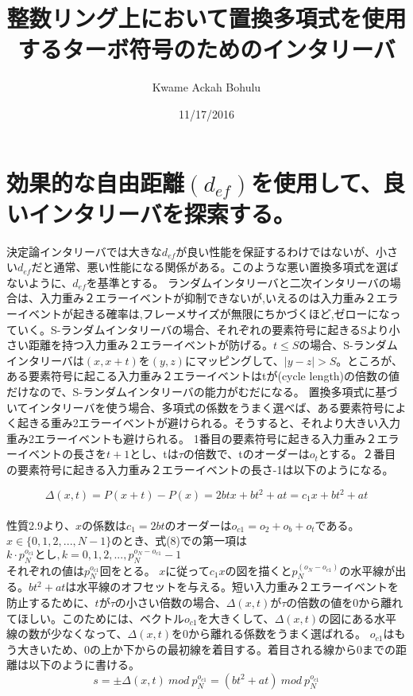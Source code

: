 \documentclass[24 pts]{article}
\title{整数リング上において置換多項式を使用するターボ符号のためのインタリーバ}
\date{11/17/2016}
\author{Kwame Ackah Bohulu}
\begin{document}
\maketitle




\section{効果的な自由距離$(d_{ef})$を使用して、良いインタリーバを探索する。}
決定論インタリーバでは大きな$d_{ef}$が良い性能を保証するわけではないが、小さい$d_{ef}$だと通常、悪い性能になる関係がある。このような悪い置換多項式を選ばないように、$d_{ef}$を基準とする。
ランダムインタリーバと二次インタリーバの場合は、入力重み２エラーイベントが抑制できないが,いえるのは入力重み２エラーイベントが起きる確率は,フレーメサイズが無限にちかづくほど,ゼローになっていく。S-ランダムインタリーバの場合、それぞれの要素符号に起きるSより小さい距離を持つ入力重み２エラーイベントが防げる。$t\leq S$の場合、S-ランダムインタリーバは$(x,x+t)$を$(y,z)$にマッピングして、$|y-z|>S$。ところが、ある要素符号に起こる入力重み２エラーイベントはtが(cycle length)の倍数の値だけなので、S-ランダムインタリーバの能力がむだになる。
置換多項式に基づいてインタリーバを使う場合、多項式の係数をうまく選べば、ある要素符号によく起きる重み2エラーイベントが避けられる。そうすると、それより大きい入力重み2エラーイベントも避けられる。
1番目の要素符号に起きる入力重み２エラーイベントの長さを$t+1$とし、tは$\tau$の倍数で、tのオーダーは$o_t$とする。２番目の要素符号に起きる入力重み２エラーイベントの長さ-1は以下のようになる。

\begin{equation}\tag{8}
\Delta(x,t)=P(x+t)-P(x)=2btx+bt^2+at=c_1x+bt^2+at 
\end{equation}
\paragraph{}
性質2.9より、$x$の係数は$c_1=2bt$のオーダーは$o_{c1}=o_2+o_b+o_t$である。$x\in\{0,1,2,...,N-1\}$のとき、式(8)での第一項は$k\cdot p_N^{o_{c1}}とし,k=0,1,2,...,p_N^{o_N-o_{c1}}-1$\\それぞれの値は$p_N^{o_{c1}}$回をとる。
$x$に従って$c_1x$の図を描くと$p_N^{(o_N-o_{c1})}$の水平線が出る。$bt^2+at$は水平線のオフセットを与える。短い入力重み２エラーイベントを防止するために、$t$が$\tau$の小さい倍数の場合、$\Delta(x,t)$が$\tau$の倍数の値を0から離れてほしい。このためには、ベクトル$o_{c1}$を大きくして、$\Delta(x,t)$の図にある水平線の数が少なくなって、$\Delta(x,t)$を0から離れる係数をうまく選ばれる。
$o_{c1}$はもう大きいため、0の上か下からの最初線を着目する。着目される線から0までの距離は以下のように書ける。
\begin{equation}\tag{9}
s=\pm \Delta(x,t) \ mod \ p_N^{o_{c1}} =( bt^2+at) \ mod \ p_N^{o_{c1}}
\end{equation}
\end{document}
